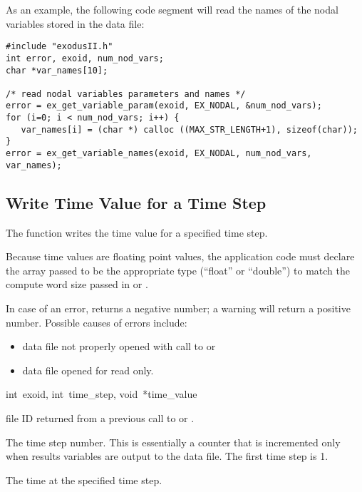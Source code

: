 As an example, the following code segment will read the names of the
nodal variables stored in the data file:

\begin{lstlisting}
#include "exodusII.h"
int error, exoid, num_nod_vars;
char *var_names[10];

/* read nodal variables parameters and names */
error = ex_get_variable_param(exoid, EX_NODAL, &num_nod_vars);
for (i=0; i < num_nod_vars; i++) {
   var_names[i] = (char *) calloc ((MAX_STR_LENGTH+1), sizeof(char));
}
error = ex_get_variable_names(exoid, EX_NODAL, num_nod_vars, var_names);
\end{lstlisting}

\subsection{Write Time Value for a Time Step}

The function  writes the time value for a
specified time step.

Because time values are floating point values, the application code
must declare the array passed to be the appropriate type (``float'' or
``double'') to match the compute word size passed in
 or .


In case of an error,  returns a negative number;
a warning will return a positive number. Possible causes of errors
include:

\begin{itemize}
 \item data file not properly opened with call to 
 or 

 \item data file opened for read only.
\end{itemize}


{int~exoid, 
int~time_step, 
void~*time_value}

\begin{parameters}
\item[{int exoid \R{}}]
\exo{} file ID returned from a previous call to  or
.

\item[{int time_step \R{}}]
The time step number. This is essentially a counter that is
incremented only when results variables are output to the data
file. The first time step is 1.

\item[{void* time_value \R{}}]
The time at the specified time step.
\end{parameters}

